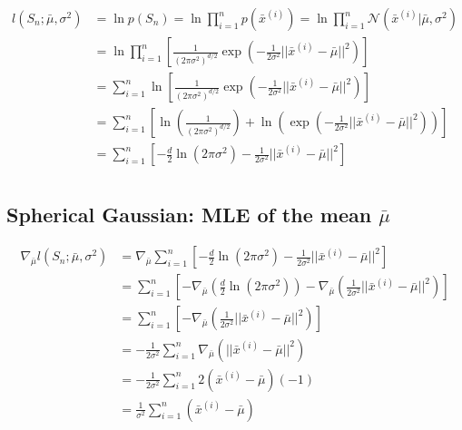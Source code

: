 \documentclass[12pt]{article}
\begin{document}
\[ 
	\begin{aligned}
		l(S_n; \bar{\mu}, \sigma^2) &= \ln p(S_n) = \ln \prod_{i=1}^n p(\bar x^{(i)}) = \ln \prod_{i=1}^n \mathcal{N}(\bar x^{(i)}|\bar{\mu}, \sigma^2) \\
																&= \ln \prod_{i=1}^n \left[\frac 1 {(2 \pi \sigma^2)^{d/2}} \exp\left( -\frac 1 {2 \sigma^2} ||\bar x^{(i)} - \bar{\mu}||^2\right)\right]\\
																&= \sum_{i=1}^n \ln \left[\frac 1 {(2 \pi \sigma^2)^{d/2}} \exp\left( -\frac 1 {2 \sigma^2} ||\bar x^{(i)} - \bar{\mu}||^2\right)\right]\\
																&= \sum_{i=1}^n \left[\ln \left(\frac 1 {(2 \pi \sigma^2)^{d/2}}\right) + \ln \left(\exp\left( -\frac 1 {2 \sigma^2} ||\bar x^{(i)} - \bar{\mu}||^2\right)\right)\right]\\
																&= \sum_{i=1}^n \left[-\frac d 2 \ln (2 \pi \sigma^2) -\frac 1 {2 \sigma^2} ||\bar x^{(i)} - \bar{\mu}||^2\right]\\
	\end{aligned}
\]

\subsection{Spherical Gaussian: MLE of the mean $\bar{\mu}$}

\[ 
	\begin{aligned}
		\nabla_{\bar{\mu}} l(S_n; \bar{\mu}, \sigma^2) &= \nabla_{\bar{\mu}} \sum_{i=1}^n \left[-\frac d 2 \ln (2 \pi \sigma^2) -\frac 1 {2 \sigma^2} ||\bar x^{(i)} - \bar{\mu}||^2\right]\\
																									 &= \sum_{i=1}^n \left[- \nabla_{\bar{\mu}} \left(\frac d 2 \ln (2 \pi \sigma^2)\right) - \nabla_{\bar{\mu}} \left(\frac 1 {2 \sigma^2} ||\bar x^{(i)} - \bar{\mu}||^2\right)\right]\\
																									 &= \sum_{i=1}^n \left[- \nabla_{\bar{\mu}} \left(\frac 1 {2 \sigma^2} ||\bar x^{(i)} - \bar{\mu}||^2\right)\right]\\
																									 &= -\frac 1 {2 \sigma^2} \sum_{i=1}^n \nabla_{\bar{\mu}} (||\bar x^{(i)} - \bar{\mu}||^2)\\
																									 &= -\frac 1 {2 \sigma^2} \sum_{i=1}^n 2(\bar x^{(i)} - \bar{\mu})(-1)\\
																									 &= \frac 1 {\sigma^2} \sum_{i=1}^n (\bar x^{(i)} - \bar{\mu})\\
	\end{aligned}
\]
\end{document}
